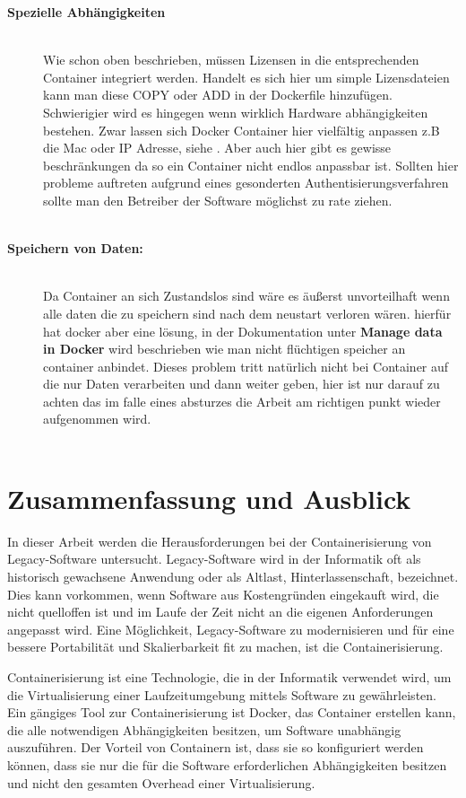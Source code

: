 \begin{description}
	\item[\textbf{Spezielle Abhängigkeiten}]\hfill \\ Wie schon oben beschrieben, müssen Lizensen in die entsprechenden Container integriert werden. Handelt es sich hier um simple Lizensdateien kann man diese COPY oder ADD \cite{dockerbuild} in der Dockerfile hinzufügen. Schwierigier wird es hingegen wenn wirklich Hardware abhängigkeiten bestehen. Zwar lassen sich Docker Container hier vielfältig anpassen z.B die Mac oder IP Adresse, siehe \cite{dockerrunnetwork}. Aber auch hier gibt es gewisse beschränkungen da so ein Container nicht endlos anpassbar ist. Sollten hier probleme auftreten aufgrund eines gesonderten Authentisierungsverfahren sollte man den Betreiber der Software möglichst zu rate ziehen. \\ \\
	\item[\textbf{Speichern von Daten:}]\hfill \\ Da Container an sich Zustandslos sind wäre es äußerst unvorteilhaft wenn alle daten die zu speichern sind nach dem neustart verloren wären. hierfür hat docker aber eine lösung, in der Dokumentation unter \textbf{Manage data in Docker} \cite{dockerrstorage} wird beschrieben wie man nicht flüchtigen speicher an container anbindet. Dieses problem tritt natürlich nicht bei Container auf die nur Daten verarbeiten und dann weiter geben, hier ist nur darauf zu achten das im falle eines absturzes die Arbeit am richtigen punkt wieder aufgenommen wird.\\ \\
\end{description}

\section{Zusammenfassung und Ausblick}

In dieser Arbeit werden die Herausforderungen bei der Containerisierung von Legacy-Software untersucht. Legacy-Software wird in der Informatik oft als historisch gewachsene Anwendung oder als Altlast, Hinterlassenschaft, bezeichnet. Dies kann vorkommen, wenn Software aus Kostengründen eingekauft wird, die nicht quelloffen ist und im Laufe der Zeit nicht an die eigenen Anforderungen angepasst wird. Eine Möglichkeit, Legacy-Software zu modernisieren und für eine bessere Portabilität und Skalierbarkeit fit zu machen, ist die Containerisierung.

Containerisierung ist eine Technologie, die in der Informatik verwendet wird, um die Virtualisierung einer Laufzeitumgebung mittels Software zu gewährleisten. Ein gängiges Tool zur Containerisierung ist Docker, das Container erstellen kann, die alle notwendigen Abhängigkeiten besitzen, um Software unabhängig auszuführen. Der Vorteil von Containern ist, dass sie so konfiguriert werden können, dass sie nur die für die Software erforderlichen Abhängigkeiten besitzen und nicht den gesamten Overhead einer Virtualisierung.

